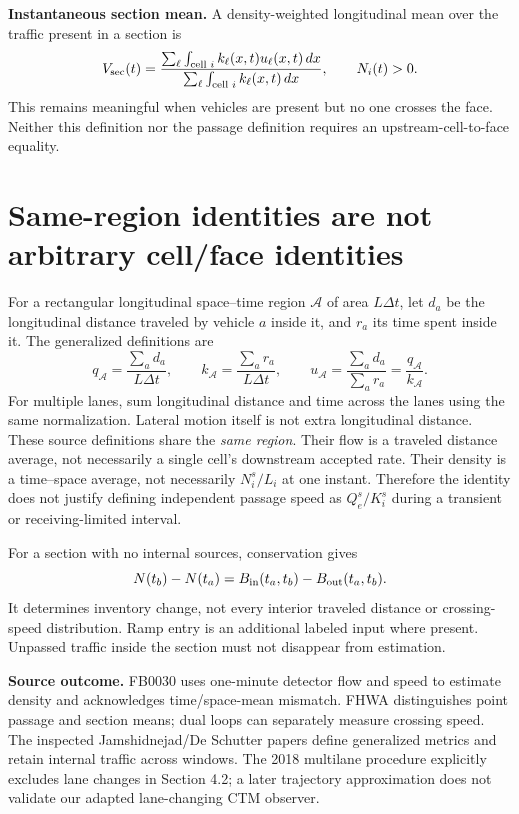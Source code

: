 \documentclass[10pt,a4paper]{article}
\begin{document}
\textbf{Instantaneous section mean.} A density-weighted longitudinal mean
over the traffic present in a section is
\begin{equation}
V_{\rm sec}(t)=
\frac{\sum_\ell\int_{\text{cell }i} k_\ell(x,t)u_\ell(x,t)\,dx}
{\sum_\ell\int_{\text{cell }i} k_\ell(x,t)\,dx},\qquad N_i(t)>0.
\end{equation}
This remains meaningful when vehicles are present but no one crosses the
face. Neither this definition nor the passage definition requires an
upstream-cell-to-face equality.
\newpage

\section{Same-region identities are not arbitrary cell/face identities}
For a rectangular longitudinal space--time region $\mathcal A$ of area
$L\Delta t$, let $d_a$ be the longitudinal distance traveled by vehicle $a$
inside it, and $r_a$ its time spent inside it. The generalized definitions are
\begin{equation}
q_{\mathcal A}=\frac{\sum_a d_a}{L\Delta t},\qquad
k_{\mathcal A}=\frac{\sum_a r_a}{L\Delta t},\qquad
u_{\mathcal A}=\frac{\sum_a d_a}{\sum_a r_a}
=\frac{q_{\mathcal A}}{k_{\mathcal A}}.
\end{equation}
For multiple lanes, sum longitudinal distance and time across the lanes using
the same normalization. Lateral motion itself is not extra longitudinal distance.
These source definitions share the \emph{same region}. Their flow is a traveled
distance average, not necessarily a single cell's downstream accepted rate.
Their density is a time--space average, not necessarily $N_i^s/L_i$ at one
instant. Therefore the identity does not justify defining independent passage
speed as $Q_e^s/K_i^s$ during a transient or receiving-limited interval.

For a section with no internal sources, conservation gives
\begin{equation}
N(t_b)-N(t_a)=B_{\rm in}(t_a,t_b)-B_{\rm out}(t_a,t_b).
\end{equation}
It determines inventory change, not every interior traveled distance or
crossing-speed distribution. Ramp entry is an additional labeled input where
present. Unpassed traffic inside the section must not disappear from estimation.

\textbf{Source outcome.} FB0030 uses one-minute detector flow and speed to
estimate density and acknowledges time/space-mean mismatch. FHWA distinguishes
point passage and section means; dual loops can separately measure crossing
speed. The inspected Jamshidnejad/De Schutter papers define generalized metrics
and retain internal traffic across windows. The 2018 multilane procedure
explicitly excludes lane changes in Section 4.2; a later trajectory approximation
does not validate our adapted lane-changing CTM observer.
\end{document}
